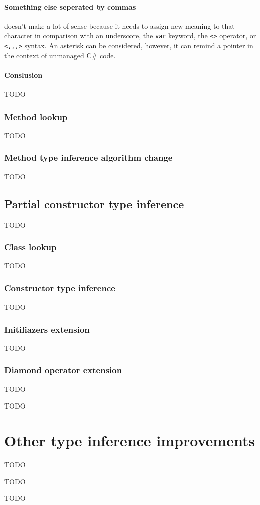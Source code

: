 \paragraph*{Something else seperated by commas} doesn't make a lot of sense because it needs to assign new meaning to that character in comparison with an underscore, the \texttt{var} keyword, the \texttt{<>} operator, or \texttt{<,,,>} syntax. An asterisk can be considered, however, it can remind a pointer in the context of unmanaged C\# code.

\paragraph*{Conslusion}
TODO

\subsubsection{Method lookup}

TODO

\subsubsection{Method type inference algorithm change}

TODO

\subsection{Partial constructor type inference}

TODO

\subsubsection*{Class lookup}

TODO

\subsubsection*{Constructor type inference}

TODO

\subsubsection*{Initiliazers extension}

TODO

\subsubsection*{Diamond operator extension}

TODO


TODO

\section{Other type inference improvements}

TODO


TODO


TODO
